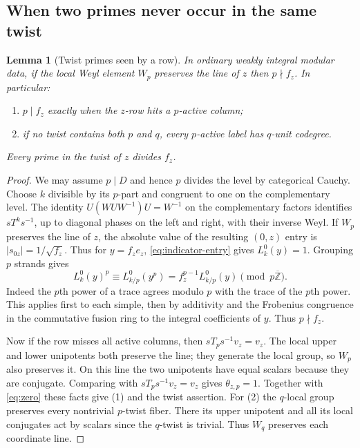 \documentclass[11pt,a4paper]{article}
\numberwithin{equation}{section}
\newtheorem{lemma}[theorem]{Lemma}
\theoremstyle{remark}
\newcommand{\ZZ}{\mathbb Z}
\begin{document}
\subsection{When two primes never occur in the same twist}\label{fam:M:sec:3.1}
\begin{lemma}[Twist primes seen by a row]\label{fam:M:3.3}\label{lem:complement}
In ordinary weakly integral modular data, if the local Weyl element
$W_p$ preserves the line of $z$ then $p\nmid f_z$. In particular:
\begin{enumerate}
\item $p\mid f_z$ exactly when the $z$-row hits a $p$-active column;
\item if no twist contains both $p$ and $q$, every $p$-active
label has $q$-unit codegree.
\end{enumerate}
Every prime in the twist of $z$ divides $f_z$.
\end{lemma}
\begin{proof}
We may assume $p\mid D$ and hence $p$ divides the level by categorical
Cauchy. Choose $k$ divisible by its $p$-part and congruent to one on
the complementary level. The identity $U(WUW^{-1})U=W^{-1}$ on
the complementary factors identifies $sT^ks^{-1}$, up to diagonal
phases on the left and right, with their inverse Weyl. If $W_p$
preserves the line of $z$, the absolute value of the resulting
$(0,z)$ entry is $|s_{0z}|=1/\sqrt{f_z}$. Thus for $y=f_ze_z$,
\eqref{eq:indicator-entry} gives $L_k^0(y)=1$. Grouping $p$ strands
gives
\[
 L_k^0(y)^p\equiv L_{k/p}^0(y^p)
             =f_z^{p-1}L_{k/p}^0(y)\pmod{p\overline{\ZZ}}.
\]
Indeed the $p$th power of a trace agrees modulo $p$ with the trace
of the $p$th power. This applies first to each simple, then by
additivity and the Frobenius congruence in the commutative fusion
ring to the integral coefficients of $y$. Thus $p\nmid f_z$.

Now if the row misses all active columns, then
$sT_p s^{-1}v_z=v_z$. The local upper and lower unipotents both
preserve the line; they generate the local group, so $W_p$ also
preserves it. On this line the two unipotents have equal scalars
because they are conjugate. Comparing with $sT_p s^{-1}v_z=v_z$
gives $\theta_{z,p}=1$. Together with \eqref{eq:zero} these facts
give (1) and the twist assertion. For (2) the $q$-local group
preserves every nontrivial $p$-twist fiber. There its upper
unipotent and all its local conjugates act by scalars since
the $q$-twist is trivial. Thus $W_q$ preserves each coordinate line.
\end{proof}
\end{document}
